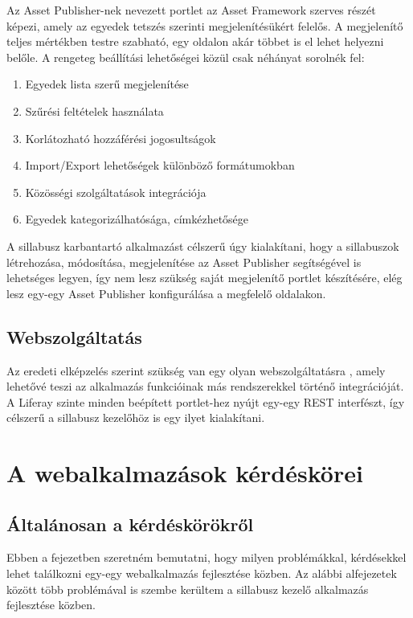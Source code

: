 \documentclass[hidelinks, 12pt, a4paper]{report}
\begin{document}
Az Asset Publisher-nek nevezett portlet az Asset Framework szerves részét képezi, amely az egyedek tetszés szerinti megjelenítésükért felelős. A megjelenítő teljes mértékben testre szabható, egy oldalon akár többet is el lehet helyezni belőle. A rengeteg beállítási lehetőségei közül csak néhányat sorolnék fel:
\begin{enumerate}
\item Egyedek lista szerű megjelenítése
\item Szűrési feltételek használata
\item Korlátozható hozzáférési jogosultságok
\item Import/Export lehetőségek különböző formátumokban
\item Közösségi szolgáltatások integrációja
\item Egyedek kategorizálhatósága, címkézhetősége
\end{enumerate}

A sillabusz karbantartó alkalmazást célszerű úgy kialakítani, hogy a sillabuszok létrehozása, módosítása, megjelenítése az Asset Publisher segítségével is lehetséges legyen, így nem lesz szükség saját megjelenítő portlet készítésére, elég lesz egy-egy Asset Publisher konfigurálása a megfelelő oldalakon.

\section{Webszolgáltatás}

Az eredeti elképzelés szerint szükség van egy olyan webszolgáltatásra \cite{java-ee-platformon}, amely lehetővé teszi az alkalmazás funkcióinak más rendszerekkel történő integrációját. A Liferay szinte minden beépített portlet-hez nyújt egy-egy REST \cite{packt-restful} interfészt, így célszerű a sillabusz kezelőhöz is egy ilyet kialakítani.

\chapter{A webalkalmazások kérdéskörei}

\section{Általánosan a kérdéskörökről}

Ebben a fejezetben szeretném bemutatni, hogy milyen problémákkal, kérdésekkel lehet találkozni egy-egy webalkalmazás fejlesztése közben. Az alábbi alfejezetek között több problémával is szembe kerültem a sillabusz kezelő alkalmazás fejlesztése közben.
\end{document}
